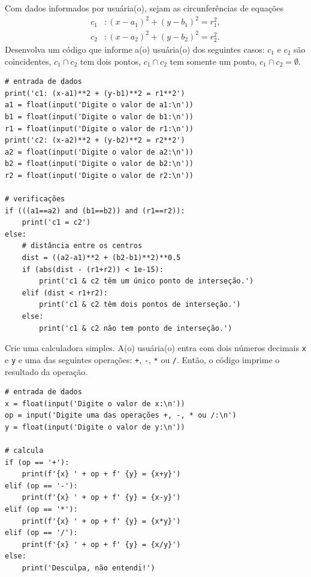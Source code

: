 \begin{exer}
  Com dados informados por usuária(o), sejam as circunferências de equações
  \begin{align}
    c_1&: (x-a_1)^2 + (y-b_1)^2 = r_1^2,\\
    c_2&: (x-a_2)^2 + (y-b_2)^2 = r_2^2.
  \end{align}
  Desenvolva um código que informe a(o) usuária(o) dos seguintes casos: $c_1$ e $c_2$ são coincidentes, $c_1\cap c_2$ tem dois pontos, $c_1\cap c_2$ tem somente um ponto, $c_1\cap c_2 = \emptyset$.
\end{exer}
\begin{resp}

\begin{lstlisting}
# entrada de dados
print('c1: (x-a1)**2 + (y-b1)**2 = r1**2')
a1 = float(input('Digite o valor de a1:\n'))
b1 = float(input('Digite o valor de b1:\n'))
r1 = float(input('Digite o valor de r1:\n'))
print('c2: (x-a2)**2 + (y-b2)**2 = r2**2')
a2 = float(input('Digite o valor de a2:\n'))
b2 = float(input('Digite o valor de b2:\n'))
r2 = float(input('Digite o valor de r2:\n'))

# verificações
if (((a1==a2) and (b1==b2)) and (r1==r2)):
    print('c1 = c2')
else:
    # distância entre os centros
    dist = ((a2-a1)**2 + (b2-b1)**2)**0.5
    if (abs(dist - (r1+r2)) < 1e-15):
        print('c1 & c2 têm um único ponto de interseção.')
    elif (dist < r1+r2):
        print('c1 & c2 têm dois pontos de interseção.')
    else:
        print('c1 & c2 não tem ponto de interseção.')
\end{lstlisting}

\end{resp}

\begin{exer}
  Crie uma calculadora simples. A(o) usuária(o) entra com dois números decimais \lstinline+x+ e \lstinline+y+ e uma das seguintes operações: \lstinline!+!, \lstinline+-+, \lstinline+*+ ou \lstinline+/+. Então, o código imprime o resultado da operação.
\end{exer}
\begin{resp}

\begin{lstlisting}
# entrada de dados
x = float(input('Digite o valor de x:\n'))
op = input('Digite uma das operações +, -, * ou /:\n')
y = float(input('Digite o valor de y:\n'))

# calcula
if (op == '+'):
    print(f'{x} ' + op + f' {y} = {x+y}')
elif (op == '-'):
    print(f'{x} ' + op + f' {y} = {x-y}')
elif (op == '*'):
    print(f'{x} ' + op + f' {y} = {x*y}')
elif (op == '/'):
    print(f'{x} ' + op + f' {y} = {x/y}')
else:
    print('Desculpa, não entendi!')
\end{lstlisting}

\end{resp}

